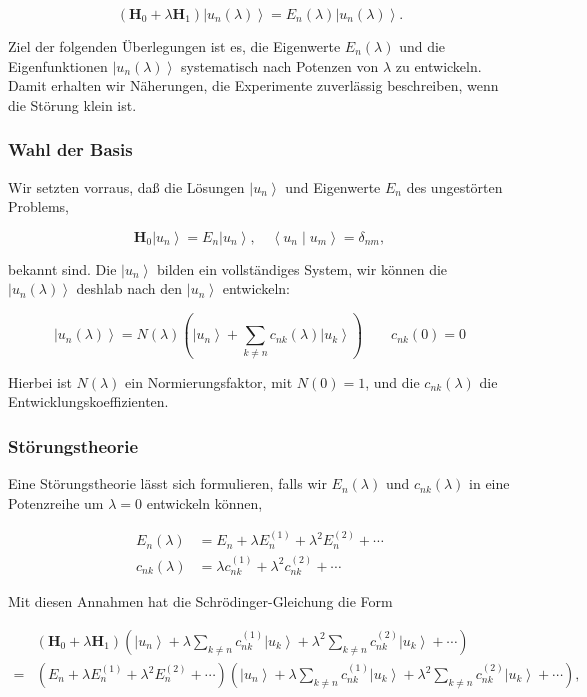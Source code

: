 \documentclass[10pt, letterpaper]{article}
\begin{document}
$$
\left(\mathbf{H}_{0}+\lambda \mathbf{H}_{1}\right)\left|u_{n}(\lambda)\right\rangle=E_{n}(\lambda)\left|u_{n}(\lambda)\right\rangle .
$$

Ziel der folgenden Überlegungen ist es, die Eigenwerte $E_{n}(\lambda)$ und die Eigenfunktionen $\left|u_{n}(\lambda)\right\rangle$ systematisch nach Potenzen von $\lambda$ zu entwickeln. Damit erhalten wir Näherungen, die Experimente zuverlässig beschreiben, wenn die Störung klein ist.

\subsubsection*{Wahl der Basis}
Wir setzten vorraus, daß die Lösungen $\left|u_{n}\right\rangle$ und Eigenwerte $E_{n}$ des ungestörten Problems,

$$
\mathbf{H}_{0}\left|u_{n}\right\rangle=E_{n}\left|u_{n}\right\rangle, \quad\left\langle u_{n} \mid u_{m}\right\rangle=\delta_{n m},
$$

bekannt sind. Die $\left|u_{n}\right\rangle$ bilden ein vollständiges System, wir können die $\left|u_{n}(\lambda)\right\rangle$ deshlab nach den $\left|u_{n}\right\rangle$ entwickeln:

$$
\left|u_{n}(\lambda)\right\rangle=N(\lambda)\left(\left|u_{n}\right\rangle+\sum_{k \neq n} c_{n k}(\lambda)\left|u_{k}\right\rangle\right) \quad \quad c_{n k}(0)=0
$$

Hierbei ist $N(\lambda)$ ein Normierungsfaktor, mit $N(0)=1$, und die $c_{n k}(\lambda)$ die Entwicklungskoeffizienten.

\subsubsection*{Störungstheorie}
Eine Störungstheorie lässt sich formulieren, falls wir $E_{n}(\lambda)$ und $c_{n k}(\lambda)$ in eine Potenzreihe um $\lambda=0$ entwickeln können,

$$
\begin{aligned}
E_{n}(\lambda) & =E_{n}+\lambda E_{n}^{(1)}+\lambda^{2} E_{n}^{(2)}+\cdots \\
c_{n k}(\lambda) & =\lambda c_{n k}^{(1)}+\lambda^{2} c_{n k}^{(2)}+\cdots
\end{aligned}
$$

Mit diesen Annahmen hat die Schrödinger-Gleichung die Form

$$
\begin{aligned}
& \left(\mathbf{H}_{0}+\lambda \mathbf{H}_{1}\right)\left(\left|u_{n}\right\rangle+\lambda \sum_{k \neq n} c_{n k}^{(1)}\left|u_{k}\right\rangle+\lambda^{2} \sum_{k \neq n} c_{n k}^{(2)}\left|u_{k}\right\rangle+\cdots\right) \\
= & \left(E_{n}+\lambda E_{n}^{(1)}+\lambda^{2} E_{n}^{(2)}+\cdots\right)\left(\left|u_{n}\right\rangle+\lambda \sum_{k \neq n} c_{n k}^{(1)}\left|u_{k}\right\rangle+\lambda^{2} \sum_{k \neq n} c_{n k}^{(2)}\left|u_{k}\right\rangle+\cdots\right),
\end{aligned}
$$
\end{document}
